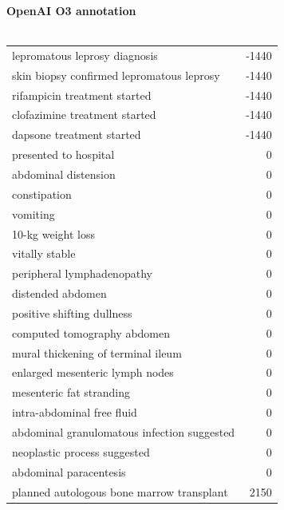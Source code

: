 \begin{figure}[!htbp]
    \begin{minipage}[!htbp]{0.49\textwidth}
    \footnotesize
        \textbf{OpenAI O3 annotation} \\ \\
        \footnotesize
        \begin{tabular}{P{0.75\textwidth}r}
            lepromatous leprosy diagnosis & -1440 \\
            skin biopsy confirmed lepromatous leprosy & -1440 \\
            rifampicin treatment started & -1440 \\
            clofazimine treatment started & -1440 \\
            dapsone treatment started & -1440 \\
            presented to hospital & 0 \\
            abdominal distension & 0 \\
            constipation & 0 \\
            vomiting & 0 \\
            10-kg weight loss & 0 \\
            vitally stable & 0 \\
            peripheral lymphadenopathy & 0 \\
            distended abdomen & 0 \\
            positive shifting dullness & 0 \\
            computed tomography abdomen & 0 \\
            mural thickening of terminal ileum & 0 \\
            enlarged mesenteric lymph nodes & 0 \\
            mesenteric fat stranding & 0 \\
            intra-abdominal free fluid & 0 \\
            abdominal granulomatous infection suggested & 0 \\
            neoplastic process suggested & 0 \\
            abdominal paracentesis & 0 \\
            planned autologous bone marrow transplant & 2150 \\

\end{tabular}
\end{minipage}
\end{figure}

